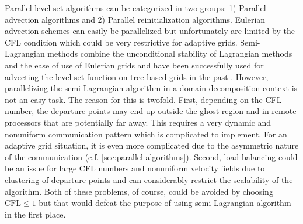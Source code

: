 Parallel level-set algorithms can be categorized in two groups: 1) Parallel advection algorithms and 2) Parallel reinitialization algorithms. Eulerian advection schemes can easily be parallelized but unfortunately are limited by the CFL condition which could be very restrictive for adaptive grids. Semi-Lagrangian methods combine the unconditional stability of Lagrangian methods and the ease of use of Eulerian grids and have been successfully used for advecting the level-set function on tree-based grids in the past \cite{Min;Gibou:07:A-second-order-accur}. However, parallelizing the semi-Lagrangian algorithm in a domain decomposition context is not an easy task. The reason for this is twofold. First, depending on the CFL number, the departure points may end up outside the ghost region and in remote processors that are potentially far away. This requires a very dynamic and nonuniform communication pattern which is complicated to implement. For an adaptive grid situation, it is even more complicated due to the asymmetric nature of the communication (c.f. \ref{sec:parallel algorithms}). Second, load balancing could be an issue for large CFL numbers and nonuniform velocity fields due to clustering of departure points and can considerably restrict the scalability of the algorithm. Both of these problems, of course, could be avoided by choosing $\text{CFL} \le 1$ but that would defeat the purpose of using semi-Lagrangian algorithm in the first place. 

